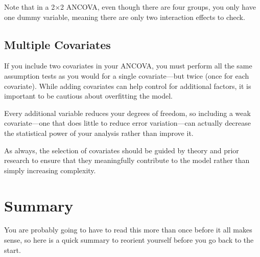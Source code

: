 \documentclass[
  letterpaper,
  DIV=11,
  numbers=noendperiod]{scrreprt}
\begin{document}
Note that in a 2×2 ANCOVA, even though there are four groups, you only
have one dummy variable, meaning there are only two interaction effects
to check.

\subsection{Multiple Covariates}\label{multiple-covariates}

If you include two covariates in your ANCOVA, you must perform all the
same assumption tests as you would for a single covariate---but twice
(once for each covariate). While adding covariates can help control for
additional factors, it is important to be cautious about overfitting the
model.

Every additional variable reduces your degrees of freedom, so including
a weak covariate---one that does little to reduce error variation---can
actually decrease the statistical power of your analysis rather than
improve it.

As always, the selection of covariates should be guided by theory and
prior research to ensure that they meaningfully contribute to the model
rather than simply increasing complexity.

\section{Summary}\label{summary-1}

You are probably going to have to read this more than once before it all
makes sense, so here is a quick summary to reorient yourself before you
go back to the start.
\end{document}
